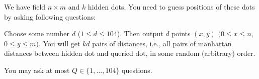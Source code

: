 
We have field $n \times m$ and $k$ hidden dots.
You need to guess positions of these dots by asking following questions:


Choose some number $d$ ($1 \leq d \leq 104$).
Then output $d$ points $(x, y)$  $(0 \leq x \leq n$, $0 \leq y \leq m)$.
You will get $kd$ pairs of distances, i.e., all pairs of manhattan distances between hidden dot and queried dot, in some random (arbitrary) order.

You may ask at most $Q\in\{1,\ldots,  104\}$ questions.
